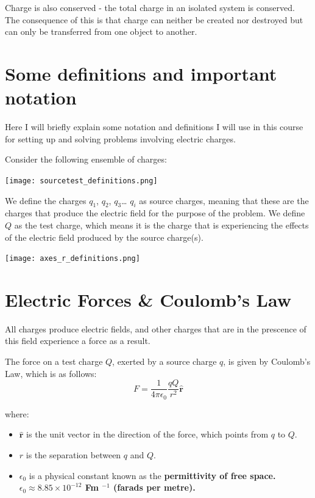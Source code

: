 \documentclass[
  letterpaper,
  DIV=11,
  numbers=noendperiod]{scrreprt}
\providecommand{\tightlist}{%
  \setlength{\itemsep}{0pt}\setlength{\parskip}{0pt}}\usepackage{longtable,booktabs,array}
\begin{document}
Charge is also conserved - the total charge in an isolated system is
conserved. The consequence of this is that charge can neither be created
nor destroyed but can only be transferred from one object to another.

\section{Some definitions and important
notation}\label{some-definitions-and-important-notation}

Here I will briefly explain some notation and definitions I will use in
this course for setting up and solving problems involving electric
charges.

Consider the following ensemble of charges:

\texttt{[image: sourcetest\_definitions.png]}

We define the charges \(q_1\), \(q_2\), \(q_3\)\ldots{} \(q_i\) as
source charges, meaning that these are the charges that produce the
electric field for the purpose of the problem. We define \(Q\) as the
test charge, which means it is the charge that is experiencing the
effects of the electric field produced by the source charge(s).

\texttt{[image: axes\_r\_definitions.png]}

\section{Electric Forces \& Coulomb's
Law}\label{electric-forces-coulombs-law}

All charges produce electric fields, and other charges that are in the
prescence of this field experience a force as a result.

The force on a test charge \(Q\), exerted by a source charge \(q\), is
given by Coulomb's Law, which is as follows:
\[ F = \frac{1}{4\pi \epsilon_0} \frac{q Q}{r^2} \hat{\mathrm{\mathbf{r}}} \]

where:

\begin{itemize}
\tightlist
\item
  \(\hat{\mathrm{\mathbf{r}}}\) is the unit vector in the direction of
  the force, which points from \(q\) to \(Q\).
\item
  \(r\) is the separation between \(q\) and \(Q\).
\item
  \(\epsilon_0\) is a physical constant known as the
  \bf{permittivity of free space}.  $\epsilon_0 \approx 8.85 \times 10^{-12}$ Fm $^{-1}$ (farads per metre). 
\end{itemize}
\end{document}
